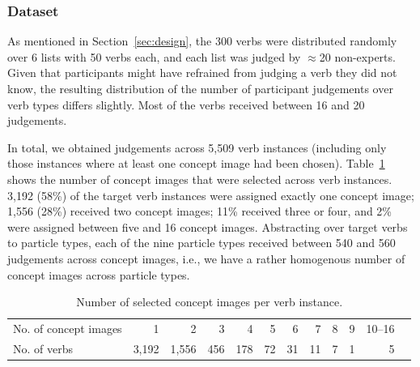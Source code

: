 \documentclass[output=paper]{langsci/langscibook}
\begin{document}
\vspace{+2mm}
\subsubsection{Dataset}

As mentioned in Section~\ref{sec:design}, the 300 verbs were
distributed randomly over 6 lists with 50 verbs each, and each list
was judged by $\approx$20 non-experts. Given that participants might
have refrained from judging a verb they did not know, the resulting
distribution of the number of participant judgements over verb types
differs slightly.
Most of the verbs received between 16 and 20 judgements.

%
%
%

In total, we obtained judgements across 5,509 verb instances
(including only those instances where at least one concept image had
been chosen).
Table~\ref{tab:cis} shows the number of concept images that were selected across
verb instances.  3,192 (58\%) of the target verb instances were
assigned exactly one concept image; 1,556 (28\%) received two concept
images; 11\% received three or four, and 2\% were assigned between
five and 16 concept images. Abstracting over target verbs to particle
types, each of the nine particle types received between 540 and 560
judgements across concept images, i.e., we have a rather homogenous number of concept images
across particle types.

\clearpage
\begin{table}
  \caption{Number of selected concept images per verb instance.}
  \label{tab:cis}

  \centering
  \begin{tabular}{lrrrrrrrrrrr}


    No. of concept images   & 1 & 2 & 3 & 4 & 5 & 6 & 7 & 8 & 9 & 10--16 \\
    No. of verbs & 3,192 & 1,556 & 456 & 178 & 72 & 31 & 11 & 7 & 1 & 5 \\

  \end{tabular}
\end{table}
\end{document}
